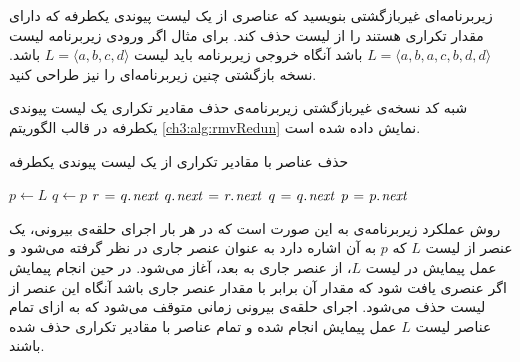  زیربرنامه‌ای غیربازگشتی بنویسید که عناصری از یک لیست پیوندی یکطرفه که دارای مقدار تکراری هستند را از لیست حذف کند. برای مثال اگر ورودی زیربرنامه لیست {$L=\langle a,b,a,c,b,d,d\rangle$} باشد آنگاه خروجی زیربرنامه باید لیست {$L=\langle a,b,c,d\rangle$} باشد. نسخه بازگشتی چنین زیربرنامه‌ای  را نیز طراحی کنید.


شبه کد نسخه‌ی غیربازگشتی زیربرنامه‌ی حذف مقادیر تکراری یک لیست پیوندی یکطرفه در قالب الگوریتم {\eqref{ch3:alg:rmvRedun}} نمایش داده شده است.
\begin{algorithm}
\caption{حذف عناصر با مقادیر تکراری از یک لیست پیوندی یکطرفه}\label{ch3:alg:rmvRedun}
\begin{latin}
\begin{algorithmic}[1]
				\State	\Return
		\EndIf
		\State	$p \gets L$
				\State	$q \gets p$
								\State	$r \mathrel{\hspace{1pt}=\hspace{1pt}} q.\hspace*{1pt}\mathit{next}$
								\State	$q.\hspace*{1pt}\mathit{next} \mathrel{\hspace{1pt}=\hspace{1pt}} r.\hspace*{1pt}\mathit{next}$
								\State	{}
						\Else
								\State	$q \mathrel{\hspace{1pt}=\hspace{1pt}} q.\hspace*{1pt}\mathit{next}$
						\EndIf
				\EndWhile
				\State	$p \mathrel{\hspace{1pt}=\hspace{1pt}} p.\hspace*{1pt}\mathit{next}$
		\EndWhile		
\EndProcedure
\end{algorithmic}
\end{latin}
\end{algorithm}

روش عملکرد زیربرنامه‌ی {} به این صورت است که در هر بار اجرای حلقه‌ی {} بیرونی، یک عنصر از لیست {$L$} که {$p$} به آن اشاره دارد به عنوان عنصر جاری در نظر گرفته می‌شود و عمل پیمایش در لیست {$L$}، از عنصر جاری به بعد، آغاز می‌شود. در حین انجام پیمایش اگر عنصری یافت شود که مقدار آن برابر با مقدار عنصر جاری باشد آنگاه این عنصر از لیست حذف می‌شود. اجرای حلقه‌ی {} بیرونی زمانی متوقف می‌شود که به ازای تمام عناصر لیست {$L$} عمل پیمایش انجام شده و تمام عناصر با مقادیر تکراری حذف شده باشند.

